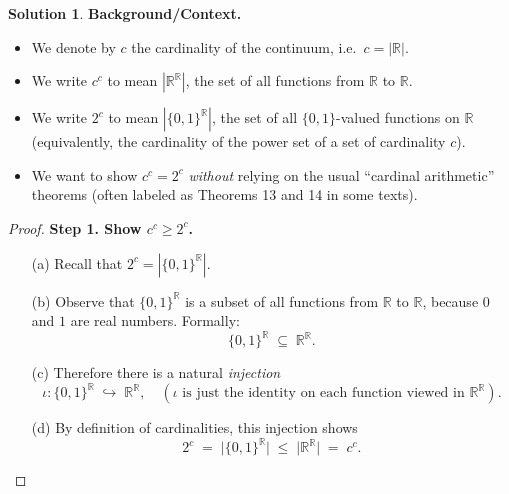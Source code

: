 \documentclass[12pt]{article}
\theoremstyle{definition} %
\newtheorem{solution}{Solution}
\theoremstyle{plain} %
\begin{document}
        \begin{solution}
   
                
                \medskip
                
                \noindent
                \textbf{Background/Context.} 
                \begin{itemize}
                \item We denote by $c$ the cardinality of the continuum, i.e.\ $c = |\mathbb{R}|$.
                \item We write $c^c$ to mean $\left|\mathbb{R}^{\mathbb{R}}\right|$, the set of all functions from $\mathbb{R}$ to $\mathbb{R}$.
                \item We write $2^c$ to mean $\left|\{0,1\}^{\mathbb{R}}\right|$, the set of all $\{0,1\}$-valued functions on $\mathbb{R}$ (equivalently, the cardinality of the power set of a set of cardinality $c$).
                \item We want to show $c^c = 2^c$ \emph{without} relying on the usual “cardinal arithmetic” theorems (often labeled as Theorems 13 and 14 in some texts).
                \end{itemize}
                
                \begin{proof}
                \textbf{Step 1. Show $c^c \ge 2^c$.}
                \begin{enumerate}
                    \item[(a)] Recall that $2^c = \left|\{0,1\}^{\mathbb{R}}\right|$.
                    \item[(b)] Observe that $\{0,1\}^{\mathbb{R}}$ is a subset of all functions from $\mathbb{R}$ to $\mathbb{R}$, because $0$ and $1$ are real numbers. Formally:
                    \[
                       \{0,1\}^{\mathbb{R}} \;\subseteq\; \mathbb{R}^{\mathbb{R}}.
                    \]
                    \item[(c)] Therefore there is a natural \emph{injection}
                    \[
                       \iota:\{0,1\}^{\mathbb{R}} \;\hookrightarrow\; \mathbb{R}^{\mathbb{R}}, 
                       \quad 
                       (\iota \text{ is just the identity on each function viewed in } \mathbb{R}^{\mathbb{R}}).
                    \]
                    \item[(d)] By definition of cardinalities, this injection shows
                    \[
                       2^c \;=\; \bigl|\{0,1\}^{\mathbb{R}}\bigr|
                       \;\le\;
                       \bigl|\mathbb{R}^{\mathbb{R}}\bigr|
                       \;=\;
                       c^c.
                    \]
                \end{enumerate}
                

\end{proof}
\end{solution}
\end{document}

